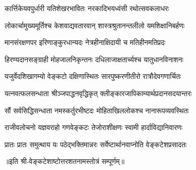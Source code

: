 \twolineshloka
{कार्त्तिकेयवपुर्धारी यतिशेखरभावितः}
{नरकादिभयध्वंसी रथोत्सवकलाधरः}
                                                        
\twolineshloka
{लोकार्चामुख्यमूर्तिश्च केशवाद्यवतारवान्}
{शास्त्रश्रुतानन्तलीलो यमशिक्षानिबर्हणः}
                                                            
\twolineshloka
{मानसंरक्षणपर इरिणाङ्कुरधान्यदः}
{नेत्रहीनाक्षिदायी च मतिहीनमतिप्रदः}
                                                                
\twolineshloka
{हिरण्यदानसङ्ग्राही मोहजालनिकृन्तनः}
{दधिलाजाक्षतार्च्यश्च यातुधानविनाशनः}
                                                                    
\twolineshloka
{यजुर्वेदशिखागम्यो वेङ्कटो दक्षिणास्थितः}
{सारपुष्करणीतीरो रात्रौदेवगणार्चितः}
                                                                        
\twolineshloka
{यत्नवत्फलसन्धाता श्रीञ्जपाद्धनवृद्धिकृत्}
{क्लीङ्कारजापिकाम्यार्थप्रदानसदयान्तरः}
                                                                            
\twolineshloka
{सौं सर्वसिद्धिसन्धाता नमस्कर्तुरभीष्टदः}
{मोहिताखिललोकश्च नानारूपव्यवस्थितः}
                                                                                
\twolineshloka
{राजीवलोचनो यज्ञवराहो गणवेङ्कटः}
{तेजोराशीक्षणः स्वामी हार्दाविद्यानिवारणः}
                                                                                    
{प्रातः प्रातः  समुत्थाय  यः  पठेद्भक्तिमान्नरः}
{सर्वेष्टार्थानवाप्नोति  वेङ्कटेशप्रसादतः}

॥इति  श्री-वेङ्कटेशाष्टोत्तरशतनामस्तोत्रं  सम्पूर्णम्॥